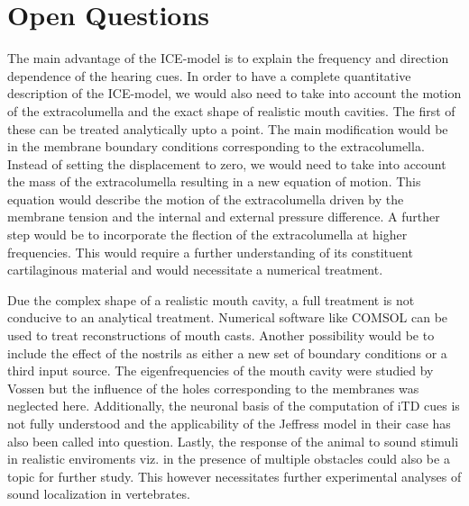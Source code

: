 \section{Open Questions}
The main advantage of the ICE-model is to explain the frequency and direction dependence of the
hearing cues. In order to have a complete quantitative description of the ICE-model, we would also need to take
into account the motion of the extracolumella and the exact shape of realistic mouth cavities. The first of
these can be treated analytically upto a point. The main modification would be in the membrane boundary
conditions corresponding to the extracolumella. Instead of setting the displacement to zero, we would need to take into
account the mass of the extracolumella resulting in a new equation of motion. This equation would describe the motion
of the extracolumella driven by the membrane tension and the internal and external pressure difference. A further step
would be to incorporate the flection of the extracolumella at higher frequencies. This would require a further 
understanding of its constituent cartilaginous material and would necessitate a numerical treatment.

Due the complex shape of a realistic mouth cavity, a full treatment is not conducive to an analytical treatment.
Numerical software like COMSOL can be used to treat reconstructions of mouth casts. Another possibility
would be to include the effect of the nostrils as either a new set of boundary conditions or a third input source. The eigenfrequencies
of the mouth cavity were studied by Vossen but the influence of the holes corresponding to the membranes was neglected here. Additionally,
the neuronal basis of the computation of iTD cues is not fully understood and the applicability of the Jeffress model in their
case has also been called into question. Lastly, the response of the animal to sound stimuli in realistic enviroments viz. in the presence
of multiple obstacles could also be a topic for further study. This however necessitates further experimental analyses of sound localization in
vertebrates.